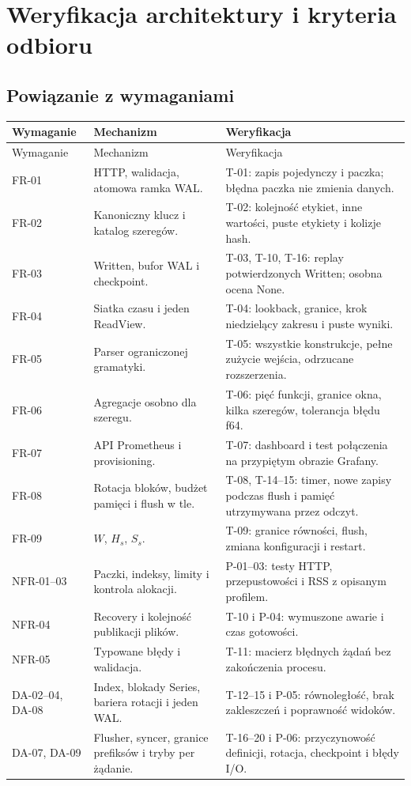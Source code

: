 \documentclass[11pt,a4paper]{article}
\newcommand{\tabhead}[1]{\toprule #1\\ \midrule\endfirsthead
  \toprule #1\\ \midrule\endhead \bottomrule\endfoot}
\begin{document}
\section{Weryfikacja architektury i kryteria odbioru}
\label{sec:verification}

\subsection{Powiązanie z wymaganiami}
\begin{longtable}{P{25mm}P{58mm}P{73mm}}
\tabhead{Wymaganie & Mechanizm & Weryfikacja}
FR-01 & HTTP, walidacja, atomowa ramka WAL. &
T-01: zapis pojedynczy i paczka; błędna paczka nie zmienia danych.\\
FR-02 & Kanoniczny klucz i katalog szeregów. &
T-02: kolejność etykiet, inne wartości, puste etykiety i kolizje hash.\\
FR-03 & Written, bufor WAL i checkpoint. &
T-03, T-10, T-16: replay potwierdzonych Written; osobna ocena None.\\
FR-04 & Siatka czasu i jeden ReadView. &
T-04: lookback, granice, krok niedzielący zakresu i puste wyniki.\\
FR-05 & Parser ograniczonej gramatyki. &
T-05: wszystkie konstrukcje, pełne zużycie wejścia, odrzucane rozszerzenia.\\
FR-06 & Agregacje osobno dla szeregu. &
T-06: pięć funkcji, granice okna, kilka szeregów, tolerancja błędu f64.\\
FR-07 & API Prometheus i provisioning. &
T-07: dashboard i test połączenia na przypiętym obrazie Grafany.\\
FR-08 & Rotacja bloków, budżet pamięci i flush w tle. &
T-08, T-14--15: timer, nowe zapisy podczas flush i pamięć utrzymywana przez odczyt.\\
FR-09 & $W$, $H_s$, $S_s$. &
T-09: granice równości, flush, zmiana konfiguracji i restart.\\
NFR-01--03 & Paczki, indeksy, limity i kontrola alokacji. &
P-01--03: testy HTTP, przepustowości i RSS z opisanym profilem.\\
NFR-04 & Recovery i kolejność publikacji plików. &
T-10 i P-04: wymuszone awarie i czas gotowości.\\
NFR-05 & Typowane błędy i walidacja. &
T-11: macierz błędnych żądań bez zakończenia procesu.\\
DA-02--04, DA-08 & Index, blokady Series, bariera rotacji i jeden WAL. &
T-12--15 i P-05: równoległość, brak zakleszczeń i poprawność widoków.\\
DA-07, DA-09 & Flusher, syncer, granice prefiksów i tryby per żądanie. &
T-16--20 i P-06: przyczynowość definicji, rotacja, checkpoint i błędy I/O.\\
\end{longtable}
\end{document}
